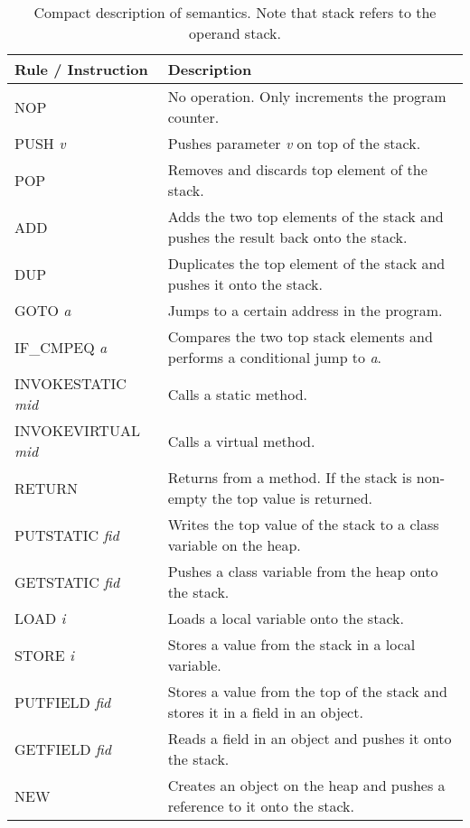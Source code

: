 \begin{table}[H]
\centering
\begin{tabular}{p{}|p{}}
\label{tab:instr}
\textbf{Rule / Instruction}	  & \vspace{0 px} \textbf{Description} \\ \hline
NOP             		  & No operation. Only increments the program counter. \\ \hline
PUSH \textit{v}           & Pushes parameter \textit{v} on top of the stack. \\ \hline
POP             		  & Removes and discards top element of the stack.\\ \hline
ADD             		  & Adds the two top elements of the stack and pushes the result back onto the stack.  \\ \hline
DUP             		  & Duplicates the top element of the stack and pushes it onto the stack. \\ \hline
GOTO \textit{a}           & Jumps to a certain address in the program.  \\ \hline
IF\_CMPEQ \textit{a}   	  & Compares the two top stack elements and performs a conditional jump to \textit{a}.  \\ \hline
INVOKESTATIC \textit{mid}    		  & Calls a static method.  \\ \hline
INVOKEVIRTUAL \textit{mid}		  & Calls a virtual method.  \\ \hline
RETURN                    & Returns from a method. If the stack is non-empty the top value is returned.   \\ \hline
PUTSTATIC \textit{fid}  & Writes the top value of the stack to a class variable on the heap.  \\ \hline
GETSTATIC \textit{fid}  & Pushes a class variable from the heap onto the stack. \\ \hline
LOAD \textit{i}           & Loads a local variable onto the stack.  \\ \hline
STORE \textit{i}          & Stores a value from the stack in a local variable.\\ \hline
PUTFIELD \textit{fid}   & Stores a value from the top of the stack and stores it in a field in an object.   \\ \hline
GETFIELD \textit{fid}	  & Reads a field in an object and pushes it onto the stack. \\ \hline
NEW   		              & Creates an object on the heap and pushes a reference to it onto the stack.  \\ \hline  
\end{tabular}
\caption{Compact description of \jcl  semantics. Note that stack refers to the operand stack.}
\end{table}


